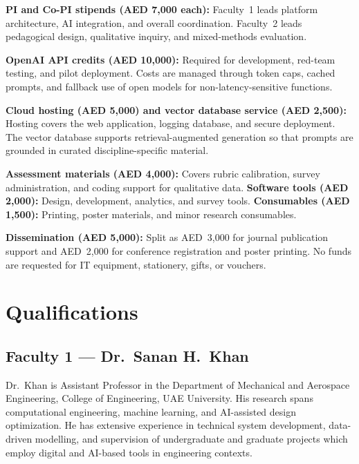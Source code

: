 \documentclass[11pt,a4paper]{article}
\begin{document}
\textbf{PI and Co-PI stipends (AED 7{,}000 each):} Faculty~1 leads platform architecture, AI integration, and overall coordination. Faculty~2 leads pedagogical design, qualitative inquiry, and mixed-methods evaluation.

\textbf{OpenAI API credits (AED 10{,}000):} Required for development, red-team testing, and pilot deployment. Costs are managed through token caps, cached prompts, and fallback use of open models for non-latency-sensitive functions.

\textbf{Cloud hosting (AED 5{,}000) and vector database service (AED 2{,}500):} Hosting covers the web application, logging database, and secure deployment. The vector database supports retrieval-augmented generation so that prompts are grounded in curated discipline-specific material.

\textbf{Assessment materials (AED 4{,}000):} Covers rubric calibration, survey administration, and coding support for qualitative data. \textbf{Software tools (AED 2{,}000):} Design, development, analytics, and survey tools. \textbf{Consumables (AED 1{,}500):} Printing, poster materials, and minor research consumables.

\textbf{Dissemination (AED 5{,}000):} Split as AED~3{,}000 for journal publication support and AED~2{,}000 for conference registration and poster printing. No funds are requested for IT equipment, stationery, gifts, or vouchers.

\section{Qualifications}

\subsection*{Faculty 1 --- Dr.\ Sanan H.\ Khan}

Dr.\ Khan is Assistant Professor in the Department of Mechanical and Aerospace Engineering, College of Engineering, UAE University. His research spans computational engineering, machine learning, and AI-assisted design optimization. He has extensive experience in technical system development, data-driven modelling, and supervision of undergraduate and graduate projects which employ digital and AI-based tools in engineering contexts.
\end{document}
